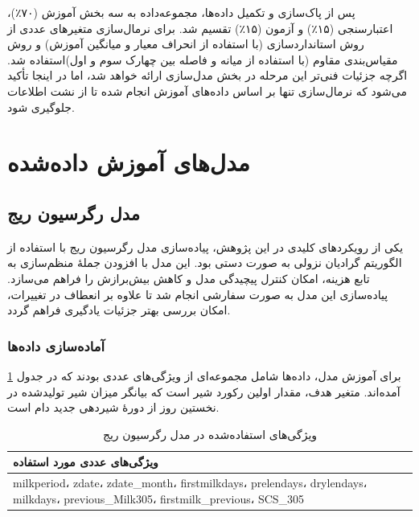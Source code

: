 پس از پاک‌سازی و تکمیل داده‌ها، مجموعه‌داده به سه بخش آموزش (۷۰٪)، اعتبارسنجی (۱۵٪) و آزمون (۱۵٪) تقسیم شد. برای نرمال‌سازی متغیرهای عددی از روش استانداردسازی (با استفاده از انحراف معیار و میانگین آموزش) و روش مقیاس‌بندی مقاوم (با استفاده از میانه و فاصله بین چهارک سوم و اول)استفاده شد. اگرچه جزئیات فنی‌تر این مرحله در بخش مدل‌سازی ارائه خواهد شد، اما در اینجا تأکید می‌شود که نرمال‌سازی تنها بر اساس داده‌های آموزش انجام شده تا از نشت اطلاعات جلوگیری شود.



\section{مدل‌های آموزش داده‌شده}

\subsection{مدل رگرسیون ریج }

یکی از رویکردهای کلیدی در این پژوهش، پیاده‌سازی مدل رگرسیون ریج با استفاده از الگوریتم گرادیان نزولی به صورت دستی بود. این مدل با افزودن جملهٔ منظم‌سازی \textit{} به تابع هزینه، امکان کنترل پیچیدگی مدل و کاهش بیش‌برازش را فراهم می‌سازد. پیاده‌سازی این مدل به صورت سفارشی انجام شد تا علاوه بر انعطاف در تغییرات، امکان بررسی بهتر جزئیات یادگیری فراهم گردد.

\subsubsection{آماده‌سازی داده‌ها}

برای آموزش مدل، داده‌ها شامل مجموعه‌ای از ویژگی‌های عددی بودند که در جدول \ref{tab:ridge_features} آمده‌اند. متغیر هدف، مقدار اولین رکورد شیر است که بیانگر میزان شیر تولیدشده در نخستین روز از دورهٔ شیردهی جدید دام است.

\begin{table}[H]
	\centering
	\caption{ویژگی‌های استفاده‌شده در مدل رگرسیون ریج}
	\renewcommand{\arraystretch}{1.3}
	\begin{tabular}{
			>{\centering\arraybackslash}m{10cm}
		}
		\toprule
		\textbf{ویژگی‌های عددی مورد استفاده} \\
		\midrule
		milkperiod، zdate، zdate\_month، firstmilkdays، prelendays، drylendays، milkdays، previous\_Milk305، firstmilk\_previous، SCS\_305 \\
		\bottomrule
	\end{tabular}
	\label{tab:ridge_features}
\end{table}


